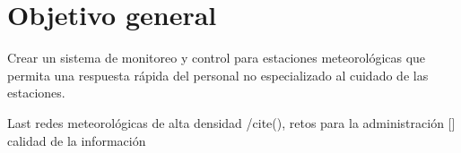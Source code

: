 \section{Objetivo general}

Crear un sistema de monitoreo y control para estaciones meteorológicas que permita una respuesta rápida del personal no especializado al cuidado de las estaciones.


Last
 redes meteorológicas de alta densidad /cite(), retos para la administración [] calidad de la información
